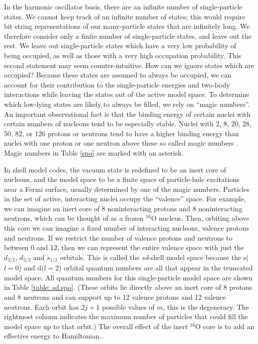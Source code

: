 In the harmonic oscillator basis, there are an infinite number of single-particle
states. We cannot keep track of an infinite number of states; this would require 
bit string representations of our many-particle states that are infinitely long. 
We therefore consider only a finite number of single-particle states, and leave out
the rest. We leave out single-particle states which have a very 
low probability of being occupied, as well as those with a very high occupation
probability. This second statement may seem counter-intuitive. How can we ignore 
states which are occupied? Because these states are assumed to always be occupied,
we can account for their contribution to the single-particle energies
and two-body interactions while leaving the states out of the active model space. 
To determine which low-lying states are likely to always be filled, we rely on
``magic numbers''.
An important observational fact is that the binding energy of certain nuclei with certain 
numbers of nucleons tend to be especially stable.
Nuclei with 2, 8, 20, 28, 50, 82, or 126 protons or neutrons tend to have 
a higher binding energy than nuclei with one proton or one neutron above these
so called magic numbers \cite{Segre}. Magic numbers in Table \ref{spo} are marked
with an asterisk. 

In shell model codes, the vacuum state is redefined to be an inert core of nucleons, 
and the model space to be a finite space of particle-hole excitations near a 
Fermi surface\cite{Heyde}, usually determined by one of the magic numbers.
Particles in the set of active, interacting nuclei occupy the ``valence'' space. 
For example, we can imagine an inert core of 8 noninteracting protons and 8 noninteracting
neutrons, which can be thought of as a frozen $^{16}$O nucleus. Then, orbiting above
this core we can imagine a fixed number of interacting nucleons, valence protons and neutrons.
If we restrict the number of valence protons and neutrons to between 0 and 12, then
we can represent the entire valence space with just the $d_{3/2}$, $d_{5/2}$ and 
$s_{1/2}$ orbitals. This is called the \textit{sd}-shell model space because the s($l=0$) and d($l=2$) 
orbital quantum numbers are all that appear in the truncated model space. All
quantum numbers for this single-particle model space are shown in Table \ref{table: sd.spo}.
(These
    orbits lie directly above an inert core of 8 protons and 8 neutrons and can
    support up to 12 valence protons and 12 valence neutrons. Each orbit has $2j+1$ 
    possible values of $m$, this is the degeneracy.
    The rightmost column indicates the maximum number of particles that could fill
    the model space up to that orbit.)
The overall effect of the inert $^{16}$O core is to add an effective energy to 
Hamiltonian.\cite{Heyde}.   

